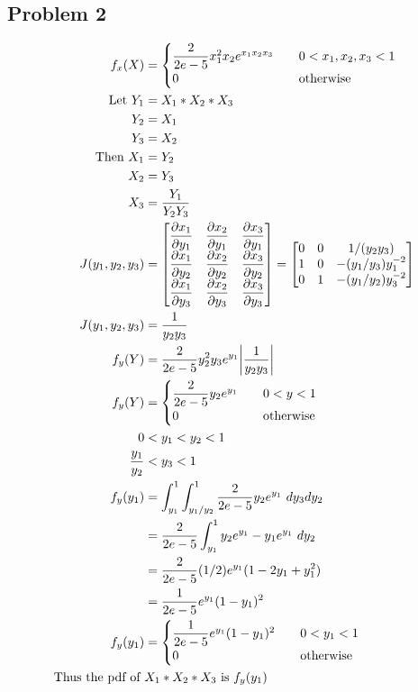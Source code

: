 \documentclass{article}
\begin{document}
\begin{flushleft}
\section*{Problem 2}
\begin{align*}
f_{x}(\boldmath{X})&= \begin{cases} \dfrac{2}{2e-5} x_1^2x_2e^{x_1x_2x_3} \quad & 0<x_1,x_2,x_3<1\\
0 \quad & \text{otherwise}
\end{cases}\\
\text{Let } Y_1&=X_1*X_2*X_3\\
Y_2&=X_1\\
Y_3&=X_2\\
\text{Then } X_1&=Y_2\\
X_2&=Y_3\\
X_3&=\dfrac{Y_1}{Y_2Y_3}\\
J(y_1,y_2,y_3)&=
\begin{bmatrix}
\dfrac{\partial x_1}{\partial y_1} & 
\dfrac{\partial x_2}{\partial y_1}&
\dfrac{\partial x_3}{\partial y_1}\\ 
\dfrac{\partial x_1}{\partial y_2} & 
\dfrac{\partial x_2}{\partial y_2}&
\dfrac{\partial x_3}{\partial y_2}\\
\dfrac{\partial x_1}{\partial y_3} & 
\dfrac{\partial x_2}{\partial y_3}&
\dfrac{\partial x_3}{\partial y_3}
\end{bmatrix}
=\begin{bmatrix}
0& 0 & 1/(y_2y_3)\\
1 & 0& -(y_1/y_3)y_1^{-2}\\
0&1&-(y_1/y_2)y_3^{-2}
\end{bmatrix}\\
J(y_1,y_2,y_3)&=\dfrac{1}{y_2y_3}\\
f_y(\boldmath{Y})&=\dfrac{2}{2e-5}y_2^2y_3e^{y_1}\bigg|\dfrac{1}{y_2y_3}\bigg|\\
f_y(\boldmath{Y})&=\begin{cases}
\dfrac{2}{2e-5}y_2e^{y_1} \quad & 0<y<1\\
0 \quad & \text{otherwise}
\end{cases}\\
0&< y_1< y_2< 1\\
\dfrac{y_1}{y_2}&< y_3< 1\\
f_y(y_1)&=\int_{y_1}^{1}\int_{y_1/y_2}^{1}\dfrac{2}{2e-5}y_2e^{y_1} \ dy_3 dy_2\\
&=\dfrac{2}{2e-5}\int_{y_1}^{1}y_2e^{y_1}-y_1e^{y_1}\ dy_2\\
&=\dfrac{2}{2e-5}(1/2)e^{y_1}(1-2y_1+y_1^2)\\
&=\dfrac{1}{2e-5}e^{y_1}(1-y_1)^2\\
f_y(y_1)&=\begin{cases}
\dfrac{1}{2e-5}e^{y_1}(1-y_1)^2 \quad & 0<y_1<1\\
0 \quad & \text{otherwise}
\end{cases}\\
\text{Thus the pdf of }& X_1*X_2*X_3 \text{ is } f_y(y_1)
\end{align*}

\end{flushleft}
\end{document}
